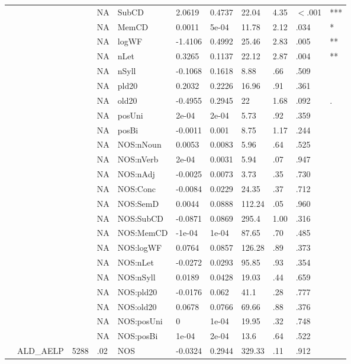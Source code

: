 \begin{table}[ht]
\begin{tabular}{lllllllllll}
   &  &  & NA & SubCD & 2.0619 & 0.4737 & 22.04 & 4.35 & $<$.001 & *** \\ 
   &  &  & NA & MemCD & 0.0011 & 5e-04 & 11.78 & 2.12 & .034 & * \\ 
   &  &  & NA & logWF & -1.4106 & 0.4992 & 25.46 & 2.83 & .005 & ** \\ 
   &  &  & NA & nLet & 0.3265 & 0.1137 & 22.12 & 2.87 & .004 & ** \\ 
   &  &  & NA & nSyll & -0.1068 & 0.1618 & 8.88 & .66 & .509 &   \\ 
   &  &  & NA & pld20 & 0.2032 & 0.2226 & 16.96 & .91 & .361 &   \\ 
   &  &  & NA & old20 & -0.4955 & 0.2945 & 22 & 1.68 & .092 & . \\ 
   &  &  & NA & posUni & 2e-04 & 2e-04 & 5.73 & .92 & .359 &   \\ 
   &  &  & NA & posBi & -0.0011 & 0.001 & 8.75 & 1.17 & .244 &   \\ 
   &  &  & NA & NOS:nNoun & 0.0053 & 0.0083 & 5.96 & .64 & .525 &   \\ 
   &  &  & NA & NOS:nVerb & 2e-04 & 0.0031 & 5.94 & .07 & .947 &   \\ 
   &  &  & NA & NOS:nAdj & -0.0025 & 0.0073 & 3.73 & .35 & .730 &   \\ 
   &  &  & NA & NOS:Conc & -0.0084 & 0.0229 & 24.35 & .37 & .712 &   \\ 
   &  &  & NA & NOS:SemD & 0.0044 & 0.0888 & 112.24 & .05 & .960 &   \\ 
   &  &  & NA & NOS:SubCD & -0.0871 & 0.0869 & 295.4 & 1.00 & .316 &   \\ 
   &  &  & NA & NOS:MemCD & -1e-04 & 1e-04 & 87.65 & .70 & .485 &   \\ 
   &  &  & NA & NOS:logWF & 0.0764 & 0.0857 & 126.28 & .89 & .373 &   \\ 
   &  &  & NA & NOS:nLet & -0.0272 & 0.0293 & 95.85 & .93 & .354 &   \\ 
   &  &  & NA & NOS:nSyll & 0.0189 & 0.0428 & 19.03 & .44 & .659 &   \\ 
   &  &  & NA & NOS:pld20 & -0.0176 & 0.062 & 41.1 & .28 & .777 &   \\ 
   &  &  & NA & NOS:old20 & 0.0678 & 0.0766 & 69.66 & .88 & .376 &   \\ 
   &  &  & NA & NOS:posUni & 0 & 1e-04 & 19.95 & .32 & .748 &   \\ 
   &  &  & NA & NOS:posBi & 1e-04 & 2e-04 & 13.6 & .64 & .522 &   \\ 
   & ALD\_AELP & 5288 & .02 & NOS & -0.0324 & 0.2944 & 329.33 & .11 & .912 &   \\ 

\end{tabular}
\end{table}

